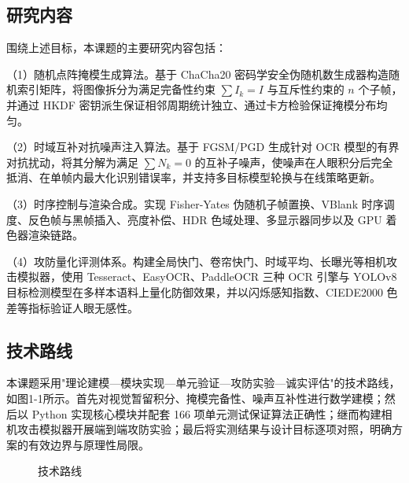 \subsection{研究内容}

围绕上述目标，本课题的主要研究内容包括：

（1）随机点阵掩模生成算法。基于 ChaCha20 密码学安全伪随机数生成器构造随机索引矩阵，将图像拆分为满足完备性约束 $\sum I_k = I$ 与互斥性约束的 $n$ 个子帧，并通过 HKDF 密钥派生保证相邻周期统计独立、通过卡方检验保证掩模分布均匀。

（2）时域互补对抗噪声注入算法。基于 FGSM/PGD 生成针对 OCR 模型的有界对抗扰动，将其分解为满足 $\sum N_k = 0$ 的互补子噪声，使噪声在人眼积分后完全抵消、在单帧内最大化识别错误率，并支持多目标模型轮换与在线策略更新。

（3）时序控制与渲染合成。实现 Fisher-Yates 伪随机子帧置换、VBlank 时序调度、反色帧与黑帧插入、亮度补偿、HDR 色域处理、多显示器同步以及 GPU 着色器渲染链路。

（4）攻防量化评测体系。构建全局快门、卷帘快门、时域平均、长曝光等相机攻击模拟器，使用 Tesseract、EasyOCR、PaddleOCR 三种 OCR 引擎与 YOLOv8 目标检测模型在多样本语料上量化防御效果，并以闪烁感知指数、CIEDE2000 色差等指标验证人眼无感性。

\subsection{技术路线}

本课题采用"理论建模—模块实现—单元验证—攻防实验—诚实评估"的技术路线，如图1-1所示。首先对视觉暂留积分、掩模完备性、噪声互补性进行数学建模；然后以 Python 实现核心模块并配套 166 项单元测试保证算法正确性；继而构建相机攻击模拟器开展端到端攻防实验；最后将实测结果与设计目标逐项对照，明确方案的有效边界与原理性局限。

\begin{figure}[htbp]
  \centering
  \caption{技术路线}
\end{figure}

